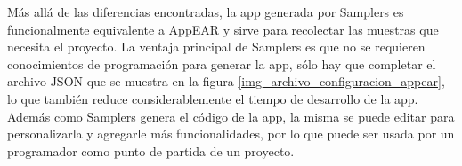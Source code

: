 Más allá de las diferencias encontradas, la app generada por Samplers es funcionalmente equivalente a AppEAR y sirve para recolectar las muestras que necesita el proyecto. La ventaja principal de Samplers es que no se requieren conocimientos de programación para generar la app, sólo hay que completar el archivo JSON que se muestra en la figura \ref{img_archivo_configuracion_appear}, lo que también reduce considerablemente el tiempo de desarrollo de la app. Además como Samplers genera el código de la app, la misma se puede editar para personalizarla y agregarle más funcionalidades, por lo que puede ser usada por un programador como punto de partida de un proyecto.

